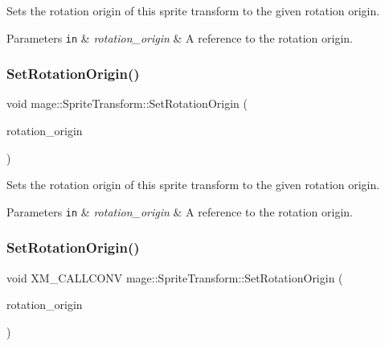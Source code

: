 Sets the rotation origin of this sprite transform to the given rotation origin.


\begin{DoxyParams}[1]{Parameters}
\mbox{\tt in}  & {\em rotation\+\_\+origin} & A reference to the rotation origin. \\
\hline
\end{DoxyParams}
\hypertarget{classmage_1_1_sprite_transform_a532771d53e650543d125ffb652671388}{}\label{classmage_1_1_sprite_transform_a532771d53e650543d125ffb652671388} 
\subsubsection{\texorpdfstring{Set\+Rotation\+Origin()}{SetRotationOrigin()}\hspace{0.1cm}{\footnotesize\ttfamily [3/4]}}
{\footnotesize\ttfamily void mage\+::\+Sprite\+Transform\+::\+Set\+Rotation\+Origin (\begin{DoxyParamCaption}\item[{X\+M\+F\+L\+O\+A\+T2 \&\&}]{rotation\+\_\+origin }\end{DoxyParamCaption})\hspace{0.3cm}{\ttfamily [noexcept]}}

Sets the rotation origin of this sprite transform to the given rotation origin.


\begin{DoxyParams}[1]{Parameters}
\mbox{\tt in}  & {\em rotation\+\_\+origin} & A reference to the rotation origin. \\
\hline
\end{DoxyParams}
\hypertarget{classmage_1_1_sprite_transform_acbb3eebc3fd26d616f5e4ca75a8c112b}{}\label{classmage_1_1_sprite_transform_acbb3eebc3fd26d616f5e4ca75a8c112b} 
\subsubsection{\texorpdfstring{Set\+Rotation\+Origin()}{SetRotationOrigin()}\hspace{0.1cm}{\footnotesize\ttfamily [4/4]}}
{\footnotesize\ttfamily void X\+M\+\_\+\+C\+A\+L\+L\+C\+O\+NV mage\+::\+Sprite\+Transform\+::\+Set\+Rotation\+Origin (\begin{DoxyParamCaption}\item[{F\+X\+M\+V\+E\+C\+T\+OR}]{rotation\+\_\+origin }\end{DoxyParamCaption})\hspace{0.3cm}{\ttfamily [noexcept]}}

